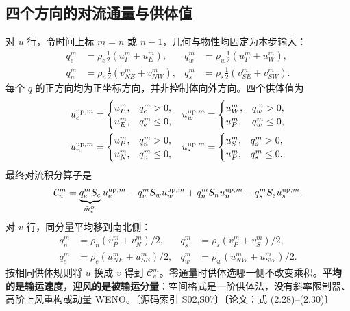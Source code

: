 \documentclass[UTF8,a4paper,11pt,fontset=fandol]{ctexart}
\newcommand{\src}[1]{\textcolor{ink}{\small〔源码索引 #1〕}}
\newcommand{\thesis}[1]{\textcolor{ink}{\small〔论文：#1〕}}
\begin{document}
\subsection{四个方向的对流通量与供体值}
对 $u$ 行，令时间上标 $m=n$ 或 $n-1$，几何与物性均固定为本步输入：
\begin{align}
 q_e^m&=\rho_e\tfrac12(u_P^m+u_E^m),&q_w^m&=\rho_w\tfrac12(u_P^m+u_W^m),\\
 q_n^m&=\rho_n\tfrac12(v_{NE}^m+v_{NW}^m),&q_s^m&=\rho_s\tfrac12(v_{SE}^m+v_{SW}^m).
\end{align}
每个 $q$ 的正方向均为正坐标方向，并非控制体向外方向。四个供体值为
\begin{align}
 u_e^{{\rm up},m}&=\begin{cases}u_P^m,&q_e^m>0,\\u_E^m,&q_e^m\le0,\end{cases}&
 u_w^{{\rm up},m}&=\begin{cases}u_W^m,&q_w^m>0,\\u_P^m,&q_w^m\le0,\end{cases}\\
 u_n^{{\rm up},m}&=\begin{cases}u_P^m,&q_n^m>0,\\u_N^m,&q_n^m\le0,\end{cases}&
 u_s^{{\rm up},m}&=\begin{cases}u_S^m,&q_s^m>0,\\u_P^m,&q_s^m\le0.\end{cases}
\end{align}
最终对流积分算子是
\begin{equation}
 \mathcal C_u^m=\underbrace{q_e^m S_e}_{\dot m_e^m}u_e^{{\rm up},m}
 -q_w^m S_wu_w^{{\rm up},m}+q_n^m S_nu_n^{{\rm up},m}-q_s^m S_su_s^{{\rm up},m}.
 \label{eq:explicit-convection}
\end{equation}
对 $v$ 行，同分量平均移到南北侧：
\begin{align}
 q_n^m&=\rho_n(v_P^m+v_N^m)/2,&q_s^m&=\rho_s(v_P^m+v_S^m)/2,\\
 q_e^m&=\rho_e(u_{NE}^m+u_{SE}^m)/2,&q_w^m&=\rho_w(u_{NW}^m+u_{SW}^m)/2.
\end{align}
按相同供体规则将 $u$ 换成 $v$ 得到 $\mathcal C_v^m$。零通量时供体选哪一侧不改变乘积。\textbf{平均的是输运速度，迎风的是被输运分量}：空间格式是一阶供体法，没有斜率限制器、高阶上风重构或动量 WENO。\src{S02,S07}\thesis{式 (2.28)--(2.30)}
\end{document}
